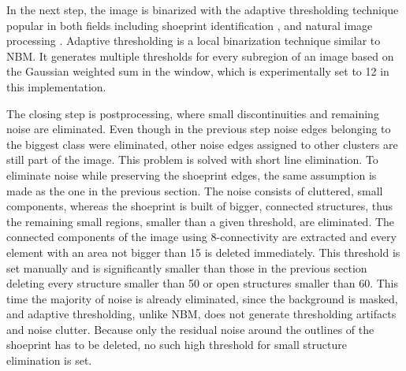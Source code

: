 \documentclass[draft,final]{vutinfth} %
\begin{document}
In the next step, the image is binarized with the adaptive thresholding technique \cite{laine1996multiscale} popular in both fields including shoeprint identification  \cite{wang2014automatic}, \cite{li2014retrieval} and natural image processing \cite{xu2016image}.
Adaptive thresholding is a local binarization technique similar to NBM.
It generates multiple thresholds for every subregion of an image based on the Gaussian weighted sum in the window, which is experimentally set to 12 in this implementation.
\par
The closing step is postprocessing, where small discontinuities and remaining noise are eliminated.
Even though in the previous step noise edges belonging to the biggest class were eliminated, other noise edges assigned to other clusters are still part of the image.
This problem is solved with short line elimination.
To eliminate noise while preserving the shoeprint edges, the same assumption is made as the one in the previous section.
The noise consists of cluttered, small components, whereas the shoeprint is built of bigger, connected structures, thus the remaining small regions, smaller than a given threshold, are eliminated.
The connected components of the image using 8-connectivity are extracted and every element with an area not bigger than 15 is deleted immediately.
This threshold is set manually and is significantly smaller than those in the previous section deleting every structure smaller than 50 or open structures smaller than 60.
This time the majority of noise is already eliminated, since the background is masked, and adaptive thresholding, unlike NBM, does not generate thresholding artifacts and noise clutter.
Because only the residual noise around the outlines of the shoeprint has to be deleted, no such high threshold for small structure elimination is set.
\end{document}
